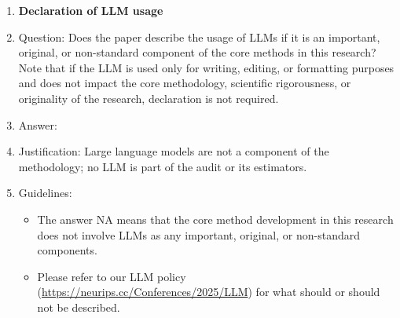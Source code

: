 \begin{enumerate}
\item {\bf Declaration of LLM usage}
    \item[] Question: Does the paper describe the usage of LLMs if it is an important, original, or non-standard component of the core methods in this research? Note that if the LLM is used only for writing, editing, or formatting purposes and does not impact the core methodology, scientific rigorousness, or originality of the research, declaration is not required.
    \item[] Answer: \answerNA{}
    \item[] Justification: Large language models are not a component of the methodology; no LLM is part of the audit or its estimators.
    \item[] Guidelines:
    \begin{itemize}
        \item The answer NA means that the core method development in this research does not involve LLMs as any important, original, or non-standard components.
        \item Please refer to our LLM policy (\url{https://neurips.cc/Conferences/2025/LLM}) for what should or should not be described.
    \end{itemize}

\end{enumerate}
